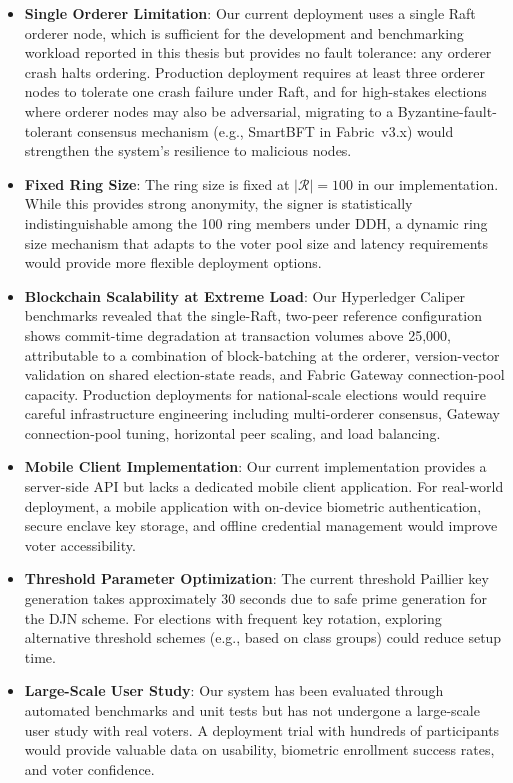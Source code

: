 \begin{itemize}
    \item \textbf{Single Orderer Limitation}: Our current deployment uses a single Raft orderer node, which is sufficient for the development and benchmarking workload reported in this thesis but provides no fault tolerance: any orderer crash halts ordering. Production deployment requires at least three orderer nodes to tolerate one crash failure under Raft, and for high-stakes elections where orderer nodes may also be adversarial, migrating to a Byzantine-fault-tolerant consensus mechanism (e.g., SmartBFT in Fabric~v3.x) would strengthen the system's resilience to malicious nodes.
    
    \item \textbf{Fixed Ring Size}: The ring size is fixed at $|\mathcal{R}| = 100$ in our implementation. While this provides strong anonymity, the signer is statistically indistinguishable among the 100 ring members under DDH, a dynamic ring size mechanism that adapts to the voter pool size and latency requirements would provide more flexible deployment options.
    
    \item \textbf{Blockchain Scalability at Extreme Load}: Our Hyperledger Caliper benchmarks revealed that the single-Raft, two-peer reference configuration shows commit-time degradation at transaction volumes above 25{,}000, attributable to a combination of block-batching at the orderer, version-vector validation on shared election-state reads, and Fabric Gateway connection-pool capacity. Production deployments for national-scale elections would require careful infrastructure engineering including multi-orderer consensus, Gateway connection-pool tuning, horizontal peer scaling, and load balancing.
    
    \item \textbf{Mobile Client Implementation}: Our current implementation provides a server-side API but lacks a dedicated mobile client application. For real-world deployment, a mobile application with on-device biometric authentication, secure enclave key storage, and offline credential management would improve voter accessibility.
    
    \item \textbf{Threshold Parameter Optimization}: The current threshold Paillier key generation takes approximately 30 seconds due to safe prime generation for the DJN scheme. For elections with frequent key rotation, exploring alternative threshold schemes (e.g., based on class groups) could reduce setup time.
    
    \item \textbf{Large-Scale User Study}: Our system has been evaluated through automated benchmarks and unit tests but has not undergone a large-scale user study with real voters. A deployment trial with hundreds of participants would provide valuable data on usability, biometric enrollment success rates, and voter confidence.
\end{itemize}

